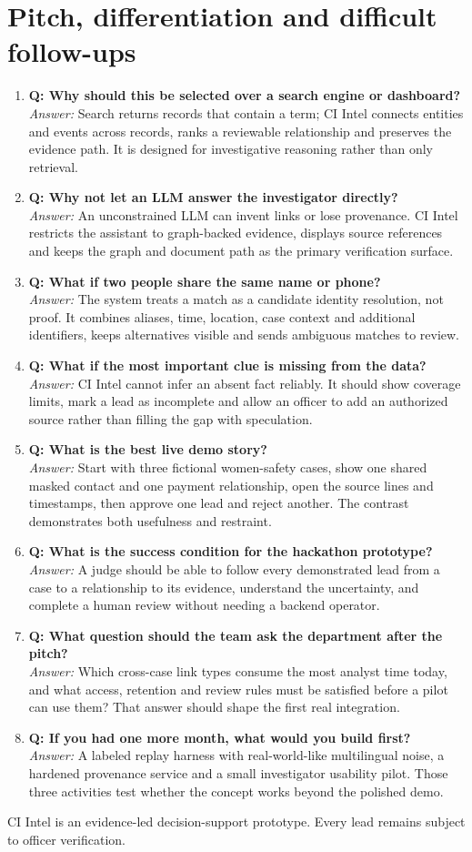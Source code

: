 \documentclass[10pt,a4paper]{article}
\newcommand{\qa}[2]{\item \textbf{\color{navy}Q: #1}\\[-1pt]{\color{coral}\textit{Answer:}} #2}
\begin{document}
\section{Pitch, differentiation and difficult follow-ups}
\begin{enumerate}[resume]
\qa{Why should this be selected over a search engine or dashboard?}{Search returns records that contain a term; CI Intel connects entities and events across records, ranks a reviewable relationship and preserves the evidence path. It is designed for investigative reasoning rather than only retrieval.}
\qa{Why not let an LLM answer the investigator directly?}{An unconstrained LLM can invent links or lose provenance. CI Intel restricts the assistant to graph-backed evidence, displays source references and keeps the graph and document path as the primary verification surface.}
\qa{What if two people share the same name or phone?}{The system treats a match as a candidate identity resolution, not proof. It combines aliases, time, location, case context and additional identifiers, keeps alternatives visible and sends ambiguous matches to review.}
\qa{What if the most important clue is missing from the data?}{CI Intel cannot infer an absent fact reliably. It should show coverage limits, mark a lead as incomplete and allow an officer to add an authorized source rather than filling the gap with speculation.}
\qa{What is the best live demo story?}{Start with three fictional women-safety cases, show one shared masked contact and one payment relationship, open the source lines and timestamps, then approve one lead and reject another. The contrast demonstrates both usefulness and restraint.}
\qa{What is the success condition for the hackathon prototype?}{A judge should be able to follow every demonstrated lead from a case to a relationship to its evidence, understand the uncertainty, and complete a human review without needing a backend operator.}
\qa{What question should the team ask the department after the pitch?}{Which cross-case link types consume the most analyst time today, and what access, retention and review rules must be satisfied before a pilot can use them? That answer should shape the first real integration.}
\qa{If you had one more month, what would you build first?}{A labeled replay harness with real-world-like multilingual noise, a hardened provenance service and a small investigator usability pilot. Those three activities test whether the concept works beyond the polished demo.}
\end{enumerate}
\vfill
\begin{center}\small\color{teal}CI Intel is an evidence-led decision-support prototype. Every lead remains subject to officer verification.\end{center}
\end{document}
